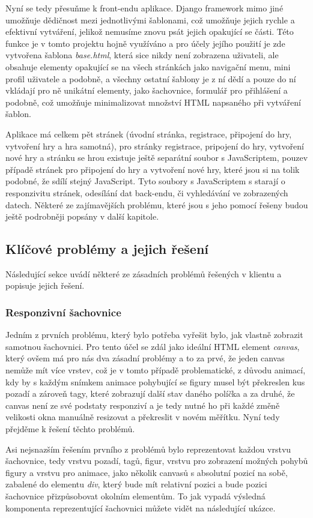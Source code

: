 \documentclass[12pt]{article}
\begin{document}
Nyní se tedy přesuňme k front-endu aplikace. Django framework mimo jiné umožňuje dědičnost mezi jednotlivými šablonami, což umožňuje jejich rychle a efektivní vytváření, jelikož nemusíme znovu psát jejich opakující se části. Této funkce je v tomto projektu hojně využíváno a pro účely jejího použití je zde vytvořena šablona \textit{base.html}, která sice nikdy není zobrazena uživateli, ale obsahuje elementy opakující se na všech stránkách jako navigační menu, mini profil uživatele a podobně, a všechny ostatní šablony je z ní dědí a pouze do ní vkládají pro ně unikátní elementy, jako šachovnice, formulář pro přihlášení a podobně, což umožňuje minimalizovat množství HTML napsaného při vytváření šablon.

Aplikace má celkem pět stránek (úvodní stránka, registrace, připojení do hry, vytvoření hry a hra samotná), pro stránky registrace, pripojení do hry, vytvoření nové hry a stránku se hrou existuje ještě separátní soubor s JavaScriptem, pouzev případě stránek pro připojení do hry a vytvoření nové hry, které jsou si na tolik podobné, že sdílí stejný JavaScript. Tyto soubory s JavaScriptem s starají o responzivitu stránek, odesílání dat back-endu, či vyhledávání ve zobrazených datech\cite{search}. Některé ze zajímavějších problému, které jsou s jeho pomocí řešeny budou ještě podrobněji popsány v další kapitole.
\newpage
\subsection{Klíčové problémy a jejich řešení}
Následující sekce uvádí některé ze zásadních problémů řešených v klientu a popisuje jejich řešení.
\subsubsection{Responzivní šachovnice}
Jedním z prvních problému, který bylo potřeba vyřešit bylo, jak vlastně zobrazit samotnou šachovnici. Pro tento účel se zdál jako ideální HTML element \textit{canvas}, který ovšem má pro nás dva zásadní problémy a to za prvé, že jeden canvas nemůže mít více vrstev, což je v tomto případě problematické, z důvodu animací, kdy by s každým snímkem animace pohybující se figury musel být překreslen kus pozadí a zároveň tagy, které zobrazují další stav daného políčka a za druhé, že canvas není ze své podstaty responziví a je tedy nutné ho při každé změně velikosti okna manuálně resizovat a překreslit v novém měřítku. Nyní tedy přejděme k řešení těchto problémů.

Asi nejsnazším řešením prvního z problémů bylo reprezentovat každou vrstvu šachovnice, tedy vrstvu pozadí, tagů, figur, vrstvu pro zobrazení možných pohybů figury a vrstvu pro animace, jako několik canvasů s absolutní pozicí na sobě, zabalené do elementu \textit{div}, který bude mít relativní pozici a bude pozici šachovnice přizpůsobovat okolním elementům. To jak vypadá výsledná komponenta reprezentující šachovnici můžete vidět na následující ukázce.
\end{document}
